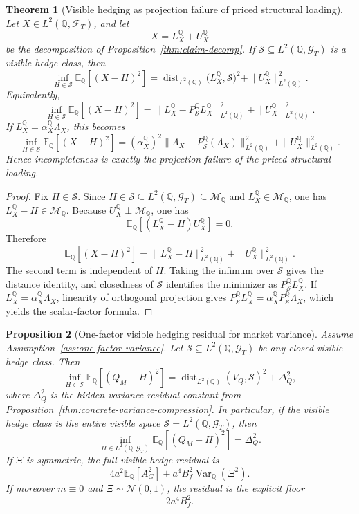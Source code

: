 \documentclass[11pt,a4paper]{amsart}
\theoremstyle{plain}
\newtheorem{theorem}{Theorem}[section]
\newtheorem{proposition}[theorem]{Proposition}
\theoremstyle{definition}
\theoremstyle{remark}
\DeclareMathOperator{\Var}{Var}
\DeclareMathOperator{\dist}{dist}
\newcommand{\QQ}{\mathbb{Q}}
\newcommand{\EE}{\mathbb{E}}
\newcommand{\cF}{\mathcal{F}}
\newcommand{\cG}{\mathcal{G}}
\newcommand{\cM}{\mathcal{M}}
\newcommand{\cS}{\mathcal{S}}
\begin{document}
\begin{theorem}[Visible hedging as projection failure of priced structural loading]\label{thm:q-hedging}
Let \(X\in L^2(\QQ,\cF_T)\), and let
\[
        X=L_X^\QQ+U_X^\QQ
\]
be the decomposition of Proposition~\ref{thm:claim-decomp}.  If
\(\cS\subseteq L^2(\QQ,\cG_T)\) is a visible hedge class, then
\[
        \inf_{H\in \cS}\EE_\QQ[(X-H)^2]
        =
        \dist_{L^2(\QQ)}\!\bigl(L_X^\QQ,\cS\bigr)^2
        +
        \|U_X^\QQ\|_{L^2(\QQ)}^2.
\]
Equivalently,
\[
        \inf_{H\in \cS}\EE_\QQ[(X-H)^2]
        =
        \|L_X^\QQ-P_{\cS}^\QQ L_X^\QQ\|_{L^2(\QQ)}^2
        +
        \|U_X^\QQ\|_{L^2(\QQ)}^2.
\]
If \(L_X^\QQ=\alpha_X^\QQ\Lambda_X\), this becomes
\[
        \inf_{H\in \cS}\EE_\QQ[(X-H)^2]
        =
        (\alpha_X^\QQ)^2
        \|\Lambda_X-P_{\cS}^\QQ(\Lambda_X)\|_{L^2(\QQ)}^2
        +
        \|U_X^\QQ\|_{L^2(\QQ)}^2.
\]
Hence incompleteness is exactly the projection failure of the priced structural loading.
\end{theorem}

\begin{proof}
Fix \(H\in\cS\).  Since
\(
        H\in\cS\subseteq L^2(\QQ,\cG_T)\subseteq \cM_\QQ
\)
and \(L_X^\QQ\in\cM_\QQ\), one has \(L_X^\QQ-H\in\cM_\QQ\).  Because
\(U_X^\QQ\perp \cM_\QQ\), one has
\[
        \EE_\QQ[(L_X^\QQ-H)U_X^\QQ]=0.
\]
Therefore
\[
        \EE_\QQ[(X-H)^2]
        =
        \|L_X^\QQ-H\|_{L^2(\QQ)}^2
        +
        \|U_X^\QQ\|_{L^2(\QQ)}^2.
\]
The second term is independent of \(H\).  Taking the infimum over \(\cS\) gives the distance
identity, and closedness of \(\cS\) identifies the minimizer as \(P_{\cS}^\QQ L_X^\QQ\).  If
\(L_X^\QQ=\alpha_X^\QQ\Lambda_X\), linearity of orthogonal projection gives
\(P_{\cS}^\QQ L_X^\QQ=\alpha_X^\QQ P_{\cS}^\QQ\Lambda_X\), which yields the scalar-factor formula.
\end{proof}

\begin{proposition}[One-factor visible hedging residual for market variance]\label{thm:concrete-hedging-residual}
Assume Assumption~\ref{ass:one-factor-variance}.  Let
\(\cS\subseteq L^2(\QQ,\cG_T)\) be any closed visible hedge class.  Then
\[
        \inf_{H\in\cS}\EE_\QQ[(Q_M-H)^2]
        =
        \dist_{L^2(\QQ)}(V_Q,\cS)^2+
        \Delta_Q^2,
\]
where \(\Delta_Q^2\) is the hidden variance-residual constant from
Proposition~\ref{thm:concrete-variance-compression}.  In particular, if the visible hedge class is the
entire visible space \(\cS=L^2(\QQ,\cG_T)\), then
\[
        \inf_{H\in L^2(\QQ,\cG_T)}\EE_\QQ[(Q_M-H)^2]
        =
        \Delta_Q^2.
\]
If \(\Xi\) is symmetric, the full-visible hedge residual is
\[
        4a^2\EE_\QQ[A_G^2]+a^4B_f^2\Var_\QQ(\Xi^2).
\]
If moreover \(m\equiv0\) and \(\Xi\sim\mathcal N(0,1)\), the residual is the explicit floor
\[
        2a^4B_f^2.
\]
\end{proposition}
\end{document}
